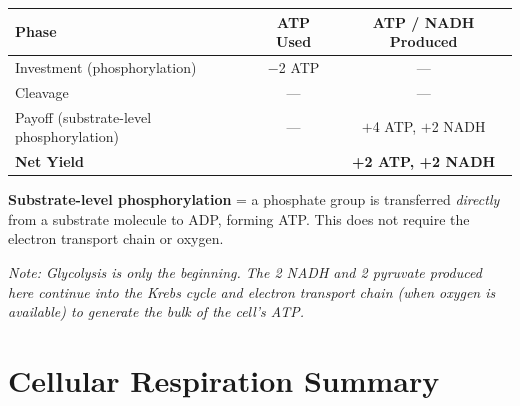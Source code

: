 \documentclass[11pt, letterpaper]{article}
\begin{document}
\vspace{4pt}

\begin{center}
\renewcommand{\arraystretch}{1.3}
\begin{tabular}{lcc}
\toprule
\rowcolor{tableheader}
\textbf{Phase} & \textbf{ATP Used} & \textbf{ATP / NADH Produced} \\
\midrule
\rowcolor{rowA} Investment (phosphorylation) & $-$2 ATP & --- \\
\rowcolor{rowBg} Cleavage                    & ---      & --- \\
\rowcolor{rowA} Payoff (substrate-level phosphorylation) & --- & $+$4 ATP, $+$2 NADH \\
\midrule
\rowcolor{tableheader} \textbf{Net Yield} & & \textbf{+2 ATP, +2 NADH} \\
\bottomrule
\end{tabular}
\end{center}

\vspace{4pt}
\textbf{Substrate-level phosphorylation} = a phosphate group is transferred \emph{directly} from a substrate molecule to ADP, forming ATP. This does not require the electron transport chain or oxygen.

\vspace{4pt}
\textit{Note: Glycolysis is only the beginning. The 2 NADH and 2 pyruvate produced here continue into the Krebs cycle and electron transport chain (when oxygen is available) to generate the bulk of the cell's ATP.}

\vspace{6pt}

\section*{Cellular Respiration Summary}
\end{document}
